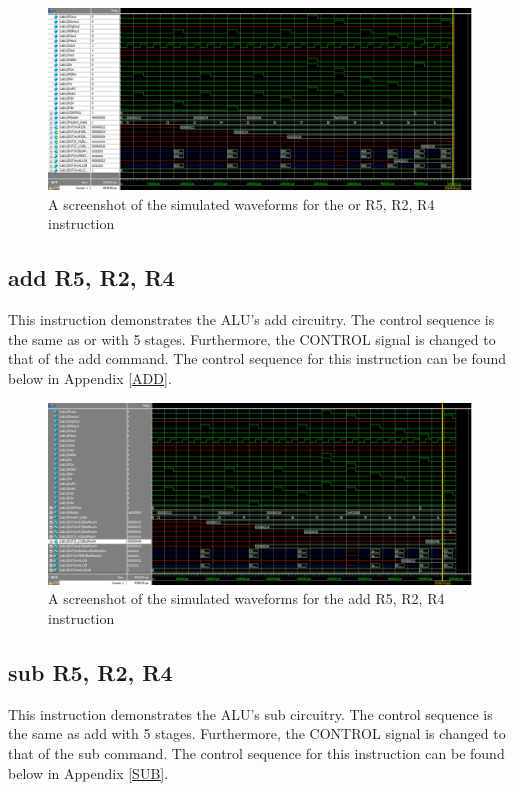 \documentclass{article}
\begin{document}
    \begin{figure}[h!]
        \begin{center}
            \includegraphics[width=13cm]{OR_final_image.png}
            \caption{A screenshot of the simulated waveforms for the or R5, R2, R4 instruction}
        \end{center}
    \end{figure}
     
    \subsection{add R5, R2, R4}
     This instruction demonstrates the ALU's add circuitry. The control sequence is the same as or with 5 stages. Furthermore, the CONTROL signal is changed to that of the add command. The control sequence for this instruction can be found below in Appendix \ref{ADD}.
     
    \begin{figure}[h!]
        \begin{center}
            \includegraphics[width=13cm]{ADD_final_image.png}
            \caption{A screenshot of the simulated waveforms for the add R5, R2, R4 instruction}
        \end{center}
    \end{figure}
     
    \subsection{sub R5, R2, R4}
     This instruction demonstrates the ALU's sub circuitry. The control sequence is the same as add with 5 stages. Furthermore, the CONTROL signal is changed to that of the sub command. The control sequence for this instruction can be found below in Appendix \ref{SUB}.
     
\end{document}
